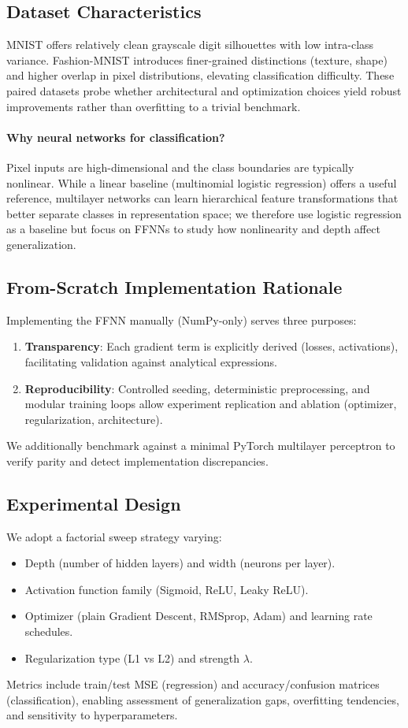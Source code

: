 \documentclass[amssymb,twocolumn,aps]{revtex4}
\begin{document}
\subsection*{Dataset Characteristics}
MNIST offers relatively clean grayscale digit silhouettes with low intra-class variance. Fashion-MNIST \cite{xiao2017fashionmnist} introduces finer-grained distinctions (texture, shape) and higher overlap in pixel distributions, elevating classification difficulty. These paired datasets probe whether architectural and optimization choices yield robust improvements rather than overfitting to a trivial benchmark.

\paragraph{Why neural networks for classification?} Pixel inputs are high-dimensional and the class boundaries are typically nonlinear. While a linear baseline (multinomial logistic regression) offers a useful reference, multilayer networks can learn hierarchical feature transformations that better separate classes in representation space; we therefore use logistic regression as a baseline but focus on FFNNs to study how nonlinearity and depth affect generalization.

\subsection*{From-Scratch Implementation Rationale}
Implementing the FFNN manually (NumPy-only) serves three purposes:
\begin{enumerate}
    \item \textbf{Transparency}: Each gradient term is explicitly derived (losses, activations), facilitating validation against analytical expressions.
    \item \textbf{Reproducibility}: Controlled seeding, deterministic preprocessing, and modular training loops allow experiment replication and ablation (optimizer, regularization, architecture).
\end{enumerate}
We additionally benchmark against a minimal PyTorch multilayer perceptron to verify parity and detect implementation discrepancies.

\subsection*{Experimental Design}
We adopt a factorial sweep strategy varying:
\begin{itemize}
    \item Depth (number of hidden layers) and width (neurons per layer).
    \item Activation function family (Sigmoid, ReLU, Leaky ReLU).
    \item Optimizer (plain Gradient Descent, RMSprop, Adam) and learning rate schedules.
    \item Regularization type (L1 vs L2) and strength $\lambda$.
\end{itemize}
Metrics include train/test MSE (regression) and accuracy/confusion matrices (classification), enabling assessment of generalization gaps, overfitting tendencies, and sensitivity to hyperparameters.
\end{document}
